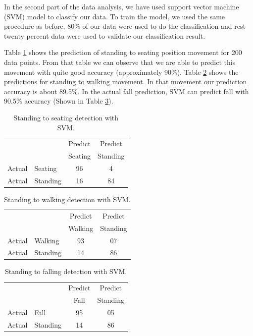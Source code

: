 \documentclass[letterpaper]{article}
\begin{document}
In the second part of the data analysis, we have used support vector machine (SVM) model
to classify our data. To train the model, we used the same procedure as before, 80\% of
our data were used to do the classification and rest twenty percent data were used to validate our
classification result.

Table \ref{tab:StandingToSeatingDetectionsvm} shows the prediction of standing to seating position
movement for 200 data points. From that table we can observe that we are able to predict this
movement with quite good accuracy (approximately 90\%). Table
\ref{tab:StandingToWalkingDetectionsvm} shows the predictions for standing to
walking movement. In that movement our prediction accuracy is about 89.5\%. In the actual fall
prediction, SVM can predict fall with 90.5\% accuracy (Shown in Table
\ref{tab:StandingToFallingDetectionsvm}).
\begin{table}[!ht]
\caption{Standing to seating detection with SVM.}
	\label{tab:StandingToSeatingDetectionsvm}
	\centering
		\begin{tabular} {l l |c |c}
			& & Predict& Predict \\ 
			& & Seating & Standing \\ \hline
			Actual& Seating & 96 & 4\\ \hline
			Actual& Standing & 16& 84\\ \hline
		\end{tabular}
\end{table}

\begin{table}[!ht]
	\caption{Standing to walking detection with SVM.}
	\label{tab:StandingToWalkingDetectionsvm}
	\centering
		\begin{tabular} {l l |c |c}
			& & Predict& Predict \\ 
			& & Walking & Standing \\ \hline
			Actual& Walking & 93 & 07\\ \hline
			Actual& Standing & 14& 86\\ \hline
		\end{tabular}
\end{table}

\begin{table}[!ht]
	\caption{Standing to falling detection with SVM.}
	\label{tab:StandingToFallingDetectionsvm}
	\centering
		\begin{tabular} {l l |c |c}
			& & Predict& Predict \\ 
			& & Fall & Standing \\ \hline
			Actual& Fall & 95 & 05\\ \hline
			Actual& Standing & 14& 86\\ \hline
		\end{tabular}
\end{table}
\end{document}

